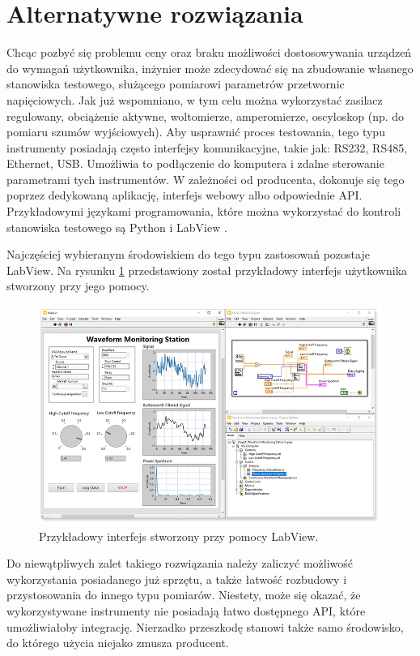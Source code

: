 \section{Alternatywne rozwiązania}

Chcąc pozbyć się problemu ceny oraz braku możliwości dostosowywania urządzeń do wymagań użytkownika, inżynier może zdecydować się na zbudowanie własnego stanowiska testowego, służącego pomiarowi parametrów przetwornic napięciowych.
Jak już wspomniano, w tym celu można wykorzystać zasilacz regulowany, obciążenie aktywne, woltomierze, amperomierze, oscyloskop (np. do pomiaru szumów wyjściowych).
Aby usprawnić proces testowania, tego typu instrumenty posiadają często interfejsy komunikacyjne, takie jak: RS232, RS485, Ethernet, USB.
Umożliwia to podłączenie do komputera i zdalne sterowanie parametrami tych instrumentów. W zależności od producenta, dokonuje się tego poprzez dedykowaną aplikację, interfejs webowy albo odpowiednie API.
Przykładowymi językami programowania, które można wykorzystać do kontroli stanowiska testowego są Python \cite{python} i LabView \cite{labview}.

Najczęściej wybieranym środowiskiem do tego typu zastosowań pozostaje LabView. Na rysunku \ref{fig:labview_grafika} przedstawiony został przykładowy interfejs użytkownika stworzony przy jego pomocy.

\begin{figure}[h!]
 \centering
 \includegraphics[width = 15cm]{images/labview.png}
 \caption{Przykładowy interfejs stworzony przy pomocy LabView.} 
 \label{fig:labview_grafika}
\end{figure}

Do niewątpliwych zalet takiego rozwiązania należy zaliczyć możliwość wykorzystania posiadanego już sprzętu, a także łatwość rozbudowy i przystosowania do innego typu pomiarów.
Niestety, może się okazać, że wykorzystywane instrumenty nie posiadają łatwo dostępnego API, które umożliwiałoby integrację. Nierzadko przeszkodę stanowi także samo środowisko, do którego użycia niejako zmusza producent.